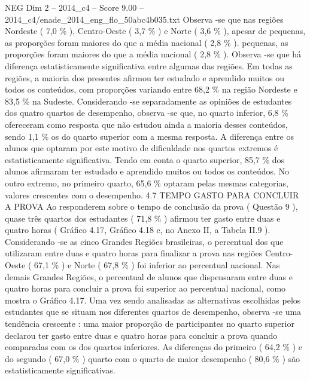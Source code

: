 \begin{textsample}{NEG Dim 2 – 2014\_c4 – Score 9.00 – 2014\_c4/enade\_2014\_eng\_flo\_50abc4b035.txt}
Observa -se que nas regiões Nordeste ( 7,0 \% ), Centro-Oeste ( 3,7 \% ) e Norte ( 3,6 \% ), apesar de pequenas, as proporções foram maiores do que a média nacional ( 2,8 \% ). pequenas, as proporções foram maiores do que a média nacional ( 2,8 \% ).
Observa -se que há diferença estatisticamente significativa entre algumas das regiões.
Em todas as regiões, a maioria dos presentes afirmou ter estudado e aprendido muitos ou todos os conteúdos, com proporções variando entre 68,2 \% na região Nordeste e 83,5 \% na Sudeste.
Considerando -se separadamente as opiniões de estudantes dos quatro quartos de desempenho, observa -se que, no quarto inferior, 6,8 \% ofereceram como resposta que não estudou ainda a maioria desses conteúdos, sendo 1,1 \% os do quarto superior com a mesma resposta.
A diferença entre os alunos que optaram por este motivo de dificuldade nos quartos extremos é estatisticamente significativa.
Tendo em conta o quarto superior, 85,7 \% dos alunos afirmaram ter estudado e aprendido muitos ou todos os conteúdos.
No outro extremo, no primeiro quarto, 65,6 \% optaram pelas mesmas categorias, valores crescentes com o desempenho. 4.7 TEMPO GASTO PARA CONCLUIR A PROVA Ao responderem sobre o tempo de conclusão da prova ( Questão 9 ), quase três quartos dos estudantes ( 71,8 \% ) afirmou ter gasto entre duas e quatro horas ( Gráfico 4.17, Gráfico 4.18 e, no Anexo II, a Tabela II.9 ).
Considerando -se as cinco Grandes Regiões brasileiras, o percentual dos que utilizaram entre duas e quatro horas para finalizar a prova nas regiões Centro-Oeste ( 67,1 \% ) e Norte ( 67,8 \% ) foi inferior ao percentual nacional.
Nas demais Grandes Regiões, o percentual de alunos que dispensaram entre duas e quatro horas para concluir a prova foi superior ao percentual nacional, como mostra o Gráfico 4.17.
Uma vez sendo analisadas as alternativas escolhidas pelos estudantes que se situam nos diferentes quartos de desempenho, observa -se uma tendência crescente : uma maior proporção de participantes no quarto superior declarou ter gasto entre duas e quatro horas para concluir a prova quando comparadas com os dos quartos inferiores.
As diferenças do primeiro ( 64,2 \% ) e do segundo ( 67,0 \% ) quarto com o quarto de maior desempenho ( 80,6 \% ) são estatisticamente significativas.

\end{textsample}
